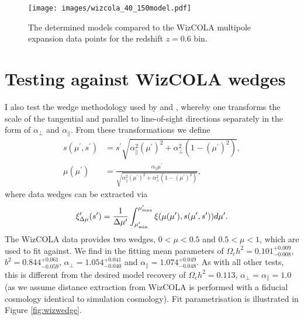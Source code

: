 \documentclass[titlesmallcaps, examinerscopy, copyrightpage]{uqthesis}
\begin{document}
\begin{figure}[h!]
  \begin{center}
    \texttt{[image: images/wizcola\_40\_150model.pdf]}
  \end{center}
  \caption{The determined models compared to the WizCOLA multipole expansion data points for the redshift $z=0.6$ bin.}
  \label{fig:wizmodel}
\end{figure}



\pagebreak
\section{Testing against WizCOLA wedges}

I also test the wedge methodology used by \citet{SanchezKazinBeutler2013} and \citet{KazinSanchezCuesta2013}, whereby one transforms the scale of the tangential and parallel to line-of-sight directions separately in the form of $\alpha_\perp$ and $\alpha_\parallel$. From these transformations we define
\begin{align}
s(\mu^\prime, s^\prime) &= s^\prime \sqrt{\alpha_\parallel^2(\mu^\prime)^2 + \alpha_\perp^2 (1 - (\mu^\prime)^2)}, \\
\mu(\mu^\prime) &= \frac{\alpha_\parallel \mu^\prime}{\sqrt{\alpha_\parallel^2(\mu^\prime)^2 + \alpha_\perp^2 (1 - (\mu^\prime)^2)}},
\end{align}
where data wedges can be extracted via
\begin{align}
\xi^\prime_{\Delta \mu}(s^\prime) = \frac{1}{\Delta \mu^\prime} \int_{\mu^\prime_{\rm{min}}}^{\mu^\prime_{\rm{max}}} \xi(\mu(\mu^\prime), s(\mu^\prime, s^\prime)) d\mu^\prime.
\end{align}
The WizCOLA data provides two wedges, $0 < \mu < 0.5$ and $0.5 < \mu < 1$, which are used to fit against. We find in the fitting mean parameters of $\Omega_c h^2 = 0.101^{+0.009}_{-0.008}$, $b^2 = 0.844^{+0.061}_{-0.059}$, $\alpha_\perp = 1.054^{+0.041}_{-0.040}$ and $\alpha_\parallel = 1.074^{+0.049}_{-0.048}$. As with all other tests, this is different from the desired model recovery of $\Omega_c h^2 = 0.113$, $\alpha_\perp = \alpha_\parallel = 1.0$ (as we assume distance extraction from WizCOLA is performed with a fiducial cosmology identical to simulation cosmology). Fit parametrisation is illustrated in Figure \ref{fig:wizwedge}.
\end{document}
